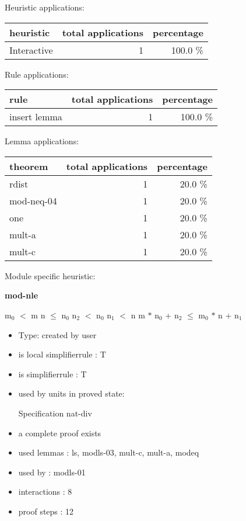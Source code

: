 \documentclass[a4paper]{article}
\begin{document}
\medskip


Heuristic applications:

\begin{supertabular}{l|r|r}
heuristic	& total applications & percentage \\ \hline
Interactive & 1 & 100.0 \% \\

\end{supertabular}

Rule applications:

\begin{supertabular}{l|r|r}
rule	        & total applications & percentage \\ \hline
insert lemma & 1 & 100.0 \% \\

\end{supertabular}

Lemma applications:

\begin{supertabular}{l|r|r}
theorem	        & total applications & percentage \\ \hline
rdist & 1 & 20.0 \% \\
mod-neq-04 & 1 & 20.0 \% \\
one & 1 & 20.0 \% \\
mult-a & 1 & 20.0 \% \\
mult-c & 1 & 20.0 \% \\

\end{supertabular}

Module specific heuristic:

\pagebreak

{\LARGE\bf mod-nle}\label{lemma-mod-nle}

\medskip

 \Fol $\mbox{m}_{0}$ $<$ m \And n $\le$ $\mbox{n}_{0}$ \And $\mbox{n}_{2}$ $<$ $\mbox{n}_{0}$ \And $\mbox{n}_{1}$ $<$ n \Imp \Not m $*$ $\mbox{n}_{0}$ + $\mbox{n}_{2}$ $\le$ $\mbox{m}_{0}$ $*$ n + $\mbox{n}_{1}$

\begin{itemize}

\item Type: created by user

\item is local simplifierrule : T
\item is simplifierrule : T
\item used by units in proved state:

Specification nat-div
\item       a complete proof exists
\item       used lemmas  : ls, modls-03, mult-c, mult-a, modeq
\item       used by      : modls-01
\item       interactions : 8
\item       proof steps  : 12
\end{itemize}
\end{document}
